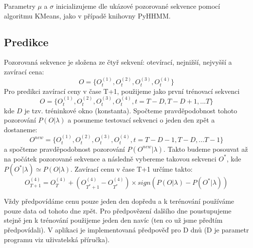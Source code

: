 Parametry \(\mu\) a \(\sigma\) inicializujeme dle ukázové pozorované sekvence pomocí algoritmu KMeans, jako v případě knihovny PyHHMM.

\subsection{Predikce}
Pozorovaná sekvence je složena ze čtyř sekvení: otevírací, nejnižší, nejvyšší a zavírací cena:
\[ O = \{O_t^{(1)},O_t^{(2)},O_t^{(3)},O_t^{(4)}\} \]
Pro predikci zavírací ceny v čase T+1, použijeme jako první trénovací sekvenci
\[ O = \{O_t^{(1)},O_t^{(2)},O_t^{(3)},O_t^{(4)}, t=T-D,T-D+1,...T\} \]
kde \(D\) je tzv. tréninkové okno (konstanta).
Spočteme pravděpodobnost tohoto pozorování \(P(O|\lambda)\) a posuneme testovací sekvenci o jeden den zpět a dostaneme:
\[ O^{new} = \{O_t^{(1)},O_t^{(2)},O_t^{(3)},O_t^{(4)}, t=T-D-1,T-D,...T-1\} \]
a spočteme pravděpodobnost pozorování \(P(O^{new}|\lambda)\). Takto budeme posouvat až na počátek pozorované sekvence a následně vybereme takovou sekvenci \(O^*\), kde \(P(O^*|\lambda)\simeq P(O|\lambda)\).
Zavírací cenu v čase T+1 určíme takto:
\[ O_{T+1}^{(4)} = O_T^{(4)} + (O_{T^*+1}^{(4)} - O_{T^*}^{(4)}) \times sign(P(O|\lambda)-P(O^*|\lambda)) \]

Vždy předpovídáme cenu pouze jeden den dopředu a k terénování používáme pouze data od tohoto dne zpět. Pro předpovězení dalšího dne poustupujeme stejně jen k trénování použijeme jeden den navíc (ten co už jsme předtím předpovídali). V aplikaci je implementovaná předpověď pro D dnů (D je parametr programu viz uživatelská příručka).

\clearpage
